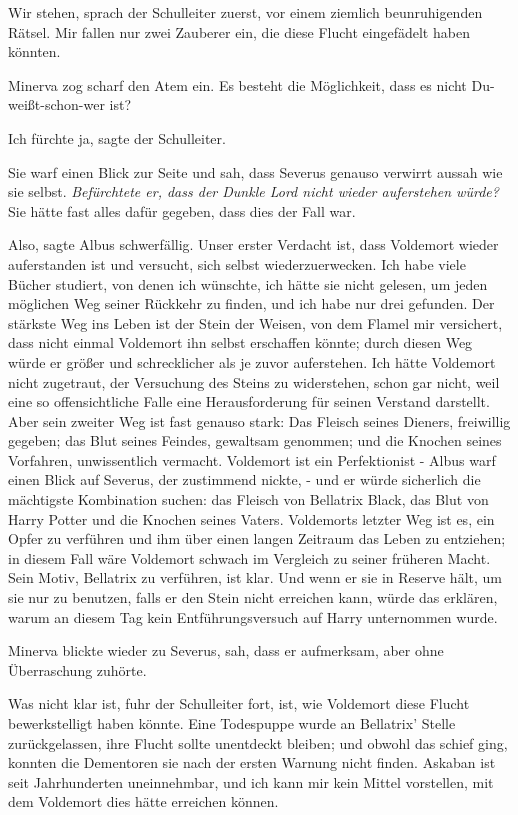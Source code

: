 \glqq{}Wir stehen\grqq{}, sprach der Schulleiter zuerst, \glqq{}vor einem ziemlich
beunruhigenden Rätsel. Mir fallen nur zwei Zauberer ein, die diese Flucht
eingefädelt haben könnten.\grqq{}

Minerva zog scharf den Atem ein. \glqq{}Es besteht die Möglichkeit, dass es nicht
Du-weißt-schon-wer ist?\grqq{}

\glqq{}Ich fürchte ja\grqq{}, sagte der Schulleiter.

Sie warf einen Blick zur Seite und sah, dass Severus genauso verwirrt aussah wie
sie selbst. \emph{Befürchtete er, dass der Dunkle Lord nicht wieder auferstehen
würde?} Sie hätte fast alles dafür gegeben, dass dies der Fall war.

\glqq{}Also\grqq{}, sagte Albus schwerfällig. \glqq{}Unser erster Verdacht ist,
dass Voldemort wieder auferstanden ist und versucht, sich selbst
wiederzuerwecken. Ich habe viele Bücher studiert, von denen ich wünschte, ich
hätte sie nicht gelesen, um jeden möglichen Weg seiner Rückkehr zu finden, und
ich habe nur drei gefunden. Der stärkste Weg ins Leben ist der Stein der Weisen,
von dem Flamel mir versichert, dass nicht einmal Voldemort ihn selbst erschaffen
könnte; durch diesen Weg würde er größer und schrecklicher als je zuvor
auferstehen. Ich hätte Voldemort nicht zugetraut, der Versuchung des Steins zu
widerstehen, schon gar nicht, weil eine so offensichtliche Falle eine
Herausforderung für seinen Verstand darstellt. Aber sein zweiter Weg ist fast
genauso stark: Das Fleisch seines Dieners, freiwillig gegeben; das Blut seines
Feindes, gewaltsam genommen; und die Knochen seines Vorfahren, unwissentlich
vermacht. Voldemort ist ein Perfektionist -\grqq{} Albus warf einen Blick auf
Severus, der zustimmend nickte, \glqq{}- und er würde sicherlich die mächtigste
Kombination suchen: das Fleisch von Bellatrix Black, das Blut von Harry Potter
und die Knochen seines Vaters. Voldemorts letzter Weg ist es, ein Opfer zu
verführen und ihm über einen langen Zeitraum das Leben zu entziehen; in diesem
Fall wäre Voldemort schwach im Vergleich zu seiner früheren Macht. Sein Motiv,
Bellatrix zu verführen, ist klar. Und wenn er sie in Reserve hält, um sie nur zu
benutzen, falls er den Stein nicht erreichen kann, würde das erklären, warum an
diesem Tag kein Entführungsversuch auf Harry unternommen wurde.\grqq{}

Minerva blickte wieder zu Severus, sah, dass er aufmerksam, aber ohne
Überraschung zuhörte.

\glqq{}Was nicht klar ist\grqq{}, fuhr der Schulleiter fort, \glqq{}ist, wie
Voldemort diese Flucht bewerkstelligt haben könnte. Eine Todespuppe wurde an
Bellatrix' Stelle zurückgelassen, ihre Flucht sollte unentdeckt bleiben; und
obwohl das schief ging, konnten die Dementoren sie nach der ersten Warnung nicht
finden. Askaban ist seit Jahrhunderten uneinnehmbar, und ich kann mir kein
Mittel vorstellen, mit dem Voldemort dies hätte erreichen können.\grqq{}

